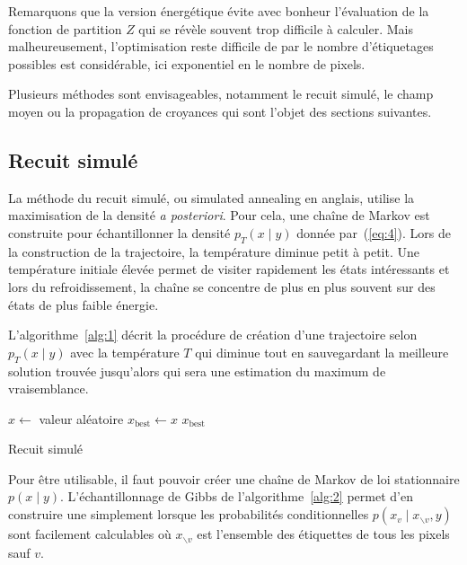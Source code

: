 \documentclass[a4paper,11pt,oneside]{article}
\begin{document}
Remarquons que la version énergétique évite avec bonheur
l'évaluation de la fonction de partition $Z$ qui se révèle
souvent trop difficile à calculer. Mais malheureusement,
l'optimisation reste difficile de par le nombre
d'étiquetages possibles est considérable, ici exponentiel en
le nombre de pixels.

Plusieurs méthodes sont envisageables, notamment le recuit
simulé, le champ moyen ou la propagation de croyances qui
sont l'objet des sections suivantes.


\subsection{Recuit simulé}
\label{sec:recuit-simule}

La méthode du recuit simulé, ou simulated annealing en
anglais, utilise la maximisation de la densité \emph{a
  posteriori}. Pour cela, une chaîne de Markov est
construite pour échantillonner la densité $p_T(x\mid y)$
donnée par~(\ref{eq:4}). Lors de la construction de la
trajectoire, la température diminue petit à petit. Une
température initiale élevée permet de visiter rapidement les
états intéressants et lors du refroidissement, la chaîne se
concentre de plus en plus souvent sur des états de plus
faible énergie.

L'algorithme~\ref{alg:1} décrit la procédure de création
d'une trajectoire selon $p_T(x\mid y)$ avec la température
$T$ qui diminue tout en sauvegardant la meilleure solution
trouvée jusqu'alors qui sera une estimation du maximum de
vraisemblance.

\begin{algorithm}
  $x\longleftarrow$ valeur aléatoire\;
  $x_\text{best} \longleftarrow x$\;
  \Return $x_\text{best}$\;
  \caption{Recuit simulé}
  \label{alg:1}
\end{algorithm}

Pour être utilisable, il faut pouvoir créer une chaîne de
Markov de loi stationnaire $p(x\mid y)$. L'échantillonnage
de Gibbs de l'algorithme~\ref{alg:2} permet d'en construire
une simplement lorsque les probabilités conditionnelles
$p(x_v\mid x_{\backslash v},y)$ sont facilement calculables
où $x_{\backslash v}$ est l'ensemble des étiquettes de tous
les pixels sauf $v$.
\end{document}
